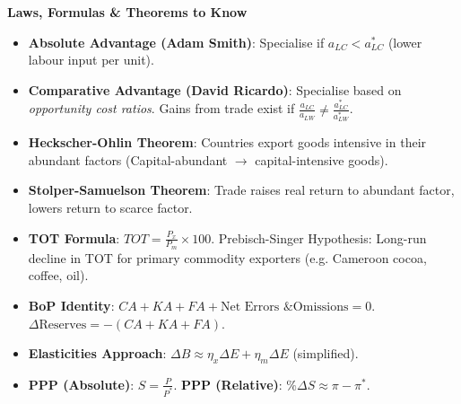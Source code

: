 \documentclass[11pt]{article}
\newcommand{\cle}[1]{{\popxbold\color{popdark}#1}}
\begin{document}
\begin{bilan}
\textbf{Laws, Formulas \& Theorems to Know}
\begin{itemize}
    \item \textbf{Absolute Advantage (Adam Smith)}: Specialise if $a_{LC} < a_{LC}^*$ (lower labour input per unit).
    \item \textbf{Comparative Advantage (David Ricardo)}: Specialise based on \emph{opportunity cost ratios}. Gains from trade exist if $\frac{a_{LC}}{a_{LW}} \neq \frac{a_{LC}^*}{a_{LW}^*}$.
    \item \textbf{Heckscher-Ohlin Theorem}: Countries export goods intensive in their abundant factors (Capital-abundant $\to$ capital-intensive goods).
    \item \textbf{Stolper-Samuelson Theorem}: Trade raises real return to abundant factor, lowers return to scarce factor.
    \item \textbf{TOT Formula}: $TOT = \frac{P_x}{P_m} \times 100$. \cle{Prebisch-Singer Hypothesis}: Long-run decline in TOT for primary commodity exporters (e.g. Cameroon cocoa, coffee, oil).
    \item \textbf{BoP Identity}: $CA + KA + FA + \text{Net Errors \& Omissions} = 0$. $\Delta \text{Reserves} = -(CA + KA + FA)$.
    \item \textbf{Elasticities Approach}: $\Delta B \approx \eta_x \Delta E + \eta_m \Delta E$ (simplified).
    \item \textbf{PPP (Absolute)}: $S = \frac{P}{P^*}$. \textbf{PPP (Relative)}: $\%\Delta S \approx \pi - \pi^*$.
\end{itemize}


\end{bilan}
\end{document}

